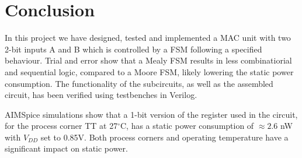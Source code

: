 \section{Conclusion}
\label{sec:conclution}

In this project we have designed, tested and implemented a MAC unit with two 2-bit inputs A and B which is controlled by a FSM following a specified behaviour. Trial and error show that a Mealy FSM results in less combinatiorial and sequential logic, compared to a Moore FSM, likely lowering the static power consumption. The functionality of the subcircuits, as well as the assembled circuit, has been verified using testbenches in Verilog. 

AIMSpice simulations show that a 1-bit version of the register used in the circuit, for the process corner TT at 27$^\circ$C, has a static power consumption of $\approx2.6$ nW with $V_{DD}$ set to 0.85V. Both process corners and operating temperature have a significant impact on static power.

 
